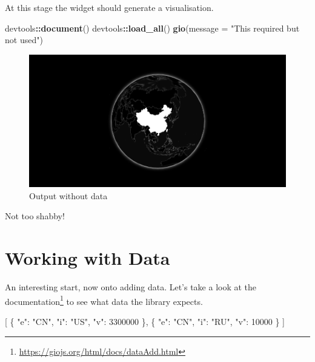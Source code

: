 \documentclass[
]{krantz}
\makeatletter
\newenvironment{Shaded}{\begin{snugshade}}{\end{snugshade}}
\newcommand{\DataTypeTok}[1]{\textcolor[rgb]{0.27,0.27,0.27}{#1}}
\newcommand{\DecValTok}[1]{\textcolor[rgb]{0.06,0.06,0.06}{#1}}
\newcommand{\FunctionTok}[1]{\textcolor[rgb]{0,0,0}{#1}}
\newcommand{\KeywordTok}[1]{\textcolor[rgb]{0.27,0.27,0.27}{\textbf{#1}}}
\newcommand{\NormalTok}[1]{#1}
\newcommand{\OperatorTok}[1]{\textcolor[rgb]{0.43,0.43,0.43}{\textbf{#1}}}
\newcommand{\OtherTok}[1]{\textcolor[rgb]{0.37,0.37,0.37}{#1}}
\newcommand{\StringTok}[1]{\textcolor[rgb]{0.5,0.5,0.5}{#1}}
\renewcommand{\href}[2]{#2\footnote{\url{#1}}}
\newenvironment{kframe}{%
\medskip{}
\setlength{\fboxsep}{.8em}
 \def\at@end@of@kframe{}%
 \ifinner\ifhmode%
  \def\at@end@of@kframe{\end{minipage}}%
  \begin{minipage}{\columnwidth}%
 \fi\fi%
 \def\FrameCommand##1{\hskip\@totalleftmargin \hskip-\fboxsep
 \colorbox{shadecolor}{##1}\hskip-\fboxsep
     \hskip-\linewidth \hskip-\@totalleftmargin \hskip\columnwidth}%
 \MakeFramed {\advance\hsize-\width
   \@totalleftmargin\z@ \linewidth\hsize
   \@setminipage}}%
 {\par\unskip\endMakeFramed%
 \at@end@of@kframe}
\renewenvironment{Shaded}{\begin{kframe}}{\end{kframe}}
\makeatother
\begin{document}
At this stage the widget should generate a visualisation.

\begin{Shaded}
\begin{Highlighting}[]
\NormalTok{devtools}\OperatorTok{::}\KeywordTok{document}\NormalTok{()}
\NormalTok{devtools}\OperatorTok{::}\KeywordTok{load\_all}\NormalTok{()}
\KeywordTok{gio}\NormalTok{(}\DataTypeTok{message =} \StringTok{"This required but not used"}\NormalTok{)}
\end{Highlighting}
\end{Shaded}

\begin{figure}
\centering
\includegraphics{images/gio-init.png}
\caption{Output without data}
\end{figure}

Not too shabby!

\hypertarget{working-with-data}{%
\section*{Working with Data}\label{working-with-data}}


An interesting start, now onto adding data. Let's take a look at the \href{https://giojs.org/html/docs/dataAdd.html}{documentation} to see what data the library expects.

\begin{Shaded}
\begin{Highlighting}[]
\OtherTok{[}
  \FunctionTok{\{}
    \DataTypeTok{"e"}\FunctionTok{:} \StringTok{"CN"}\FunctionTok{,}
    \DataTypeTok{"i"}\FunctionTok{:} \StringTok{"US"}\FunctionTok{,}
    \DataTypeTok{"v"}\FunctionTok{:} \DecValTok{3300000}
  \FunctionTok{\}}\OtherTok{,}
  \FunctionTok{\{}
    \DataTypeTok{"e"}\FunctionTok{:} \StringTok{"CN"}\FunctionTok{,}
    \DataTypeTok{"i"}\FunctionTok{:} \StringTok{"RU"}\FunctionTok{,}
    \DataTypeTok{"v"}\FunctionTok{:} \DecValTok{10000}
  \FunctionTok{\}}
\OtherTok{]}
\end{Highlighting}
\end{Shaded}
\end{document}
